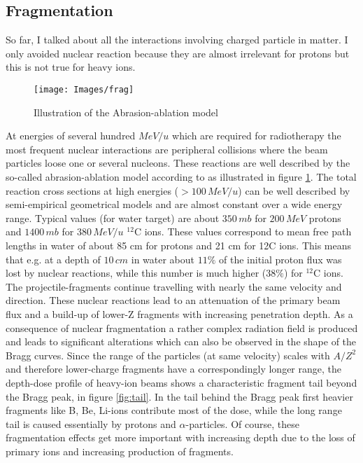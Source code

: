 \documentclass[12pt, a4paper, twoside]{book}
\begin{document}
\subsection{Fragmentation}
So far, I talked about all the interactions involving charged particle in matter. I only avoided nuclear reaction because they are almost irrelevant for protons but this is not true for heavy ions.

\begin{figure}[!h]
{\texttt{[image: Images/frag]}}
\caption{Illustration of the Abrasion-ablation model}
\label{fig:frag}
\end{figure}

At energies of several hundred $MeV/u$ which are required for radiotherapy the most frequent nuclear interactions are peripheral collisions where the beam particles loose one or several nucleons. These reactions are well described by the so-called abrasion-ablation model according to \cite{serb:nucRea} as illustrated in figure \ref{fig:frag}.
The total reaction cross sections at high energies ($>100\,MeV/u$) can be well described by semi-empirical geometrical models and are almost constant over a wide energy range. Typical values (for water target) are about $350\, mb$ for $200\,MeV$ protons and $1400\,mb$ for $380\,MeV/u$ $^{12}$C ions. These values correspond to mean free path lengths in water of about 85 cm for protons and 21 cm for 12C ions. This means that e.g. at a depth of $10\,cm$ in water about $11\%$ of the initial proton flux was lost by nuclear reactions, while this number is much higher ($38\%$) for $^{12}$C ions.
The projectile-fragments continue travelling with nearly the same velocity and direction. These nuclear reactions lead to an attenuation of the primary beam flux and a build-up of lower-Z fragments with increasing penetration depth.
As a consequence of nuclear fragmentation a rather complex radiation field is produced and leads to significant alterations which can also be observed in the shape of the Bragg curves. Since the range of the particles (at same velocity) scales with $A/Z^2$ and therefore lower-charge fragments have a correspondingly longer range, the depth-dose profile of heavy-ion beams shows a characteristic fragment tail beyond the Bragg peak, in figure \ref{fig:tail}.
In the tail behind the Bragg peak first heavier fragments like B, Be, Li-ions contribute most of the dose, while the long range tail is caused essentially by protons and $\alpha$-particles. Of course, these fragmentation effects get more important with increasing depth due to the loss of primary ions and increasing production of fragments.
\end{document}
